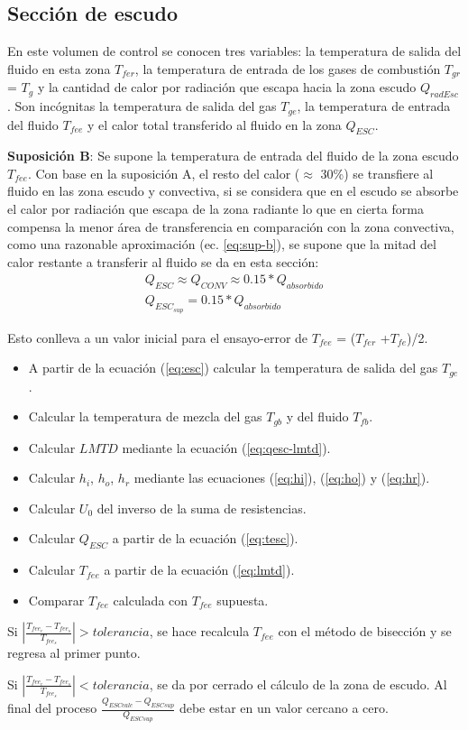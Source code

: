 \subsection{Sección de escudo}
\par En este volumen de control se conocen tres variables: la temperatura de salida del fluido en esta zona $T_{fer}$, la temperatura de entrada de los gases de combustión $T_{gr}$ = $T_g$ y la cantidad de calor por radiación que escapa hacia la zona escudo $Q_{radEsc}$. Son incógnitas la temperatura de salida del gas $T_{ge}$, la temperatura de entrada del fluido $T_{fee}$ y el calor total transferido al fluido en la zona $Q_{ESC}$.
\par \textbf{Suposición B}: Se supone la temperatura de entrada del fluido de la zona escudo $T_{fee}$. Con base en la suposición A, el resto del calor ($\approx$ 30\%) se transfiere al fluido en las zona escudo y convectiva, si se considera que en el escudo se absorbe el calor por radiación que escapa de la zona radiante lo que en cierta forma compensa la menor área de transferencia en comparación con la zona convectiva, como una razonable aproximación (ec. \ref{eq:sup-b}), se supone que la mitad del calor restante a transferir al fluido se da en esta sección:
\begin{equation}\label{eq:sup-b}\begin{gathered}
    Q_{ESC} \approx Q_{CONV} \approx 0.15 * Q_{absorbido}\\
    Q_{ESC_{sup}} = 0.15 * Q_{absorbido} 
\end{gathered}\end{equation}
\par Esto conlleva a un valor inicial para el ensayo-error de $T_{fee}$ = ($T_{fer}$ +$T_{fe}$)/2. 
\begin{itemize}
    \item A partir de la ecuación (\ref{eq:esc}) calcular la temperatura de salida del gas $T_{ge}$.
    \item Calcular la temperatura de mezcla del gas $T_{gb}$ y del fluido $T_{fb}$.
    \item Calcular $LMTD$ mediante la ecuación (\ref{eq:qesc-lmtd}).
    \item Calcular $h_i$, $h_o$, $h_r$ mediante las ecuaciones (\ref{eq:hi}), (\ref{eq:ho}) y (\ref{eq:hr}).
    \item Calcular $U_0$ del inverso de la suma de resistencias.
    \item Calcular $Q_{ESC}$ a partir de la ecuación (\ref{eq:tesc}).
    \item Calcular $T_{fee}$ a partir de la ecuación (\ref{eq:lmtd}).
    \item Comparar $T_{fee}$ calculada con $T_{fee}$ supuesta.
\end{itemize}
\par Si $|\frac{T_{fee_c} - T_{fee_s}}{T_{fee_s}}| > tolerancia$, se hace recalcula $T_{fee}$ con el método de bisección y se regresa al primer punto.
\par Si $|\frac{T_{fee_c} - T_{fee_s}}{T_{fee_s}} | < tolerancia$, se da por cerrado el cálculo de la zona de escudo. Al final del proceso $\frac{Q_{ESCcalc} - Q_{ESCsup}}{ Q_{ESCsup}}$ debe estar en un valor cercano a cero.

